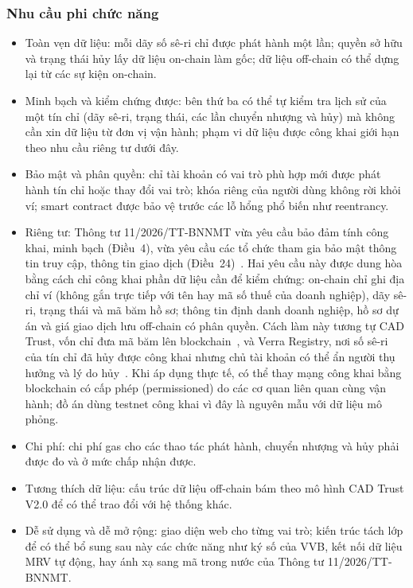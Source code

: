 \subsubsection*{Nhu cầu phi chức năng}

\begin{itemize}
    \item Toàn vẹn dữ liệu: mỗi dãy số sê-ri chỉ được phát hành một lần; quyền sở hữu và trạng thái hủy lấy dữ liệu on-chain làm gốc; dữ liệu off-chain có thể dựng lại từ các sự kiện on-chain.
    \item Minh bạch và kiểm chứng được: bên thứ ba có thể tự kiểm tra lịch sử của một tín chỉ (dãy sê-ri, trạng thái, các lần chuyển nhượng và hủy) mà không cần xin dữ liệu từ đơn vị vận hành; phạm vi dữ liệu được công khai giới hạn theo nhu cầu riêng tư dưới đây.
    \item Bảo mật và phân quyền: chỉ tài khoản có vai trò phù hợp mới được phát hành tín chỉ hoặc thay đổi vai trò; khóa riêng của người dùng không rời khỏi ví; smart contract được bảo vệ trước các lỗ hổng phổ biến như reentrancy.
    \item Riêng tư: Thông tư 11/2026/TT-BNNMT vừa yêu cầu bảo đảm tính công khai, minh bạch (Điều~4), vừa yêu cầu các tổ chức tham gia bảo mật thông tin truy cập, thông tin giao dịch (Điều~24)~\cite{vietnam2026thongtu11}. Hai yêu cầu này được dung hòa bằng cách chỉ công khai phần dữ liệu cần để kiểm chứng: on-chain chỉ ghi địa chỉ ví (không gắn trực tiếp với tên hay mã số thuế của doanh nghiệp), dãy sê-ri, trạng thái và mã băm hồ sơ; thông tin định danh doanh nghiệp, hồ sơ dự án và giá giao dịch lưu off-chain có phân quyền. Cách làm này tương tự CAD Trust, vốn chỉ đưa mã băm lên blockchain~\cite{cadtrust2025datamodel}, và Verra Registry, nơi số sê-ri của tín chỉ đã hủy được công khai nhưng chủ tài khoản có thể ẩn người thụ hưởng và lý do hủy~\cite{verra2020registryv2}. Khi áp dụng thực tế, có thể thay mạng công khai bằng blockchain có cấp phép (permissioned) do các cơ quan liên quan cùng vận hành; đồ án dùng testnet công khai vì đây là nguyên mẫu với dữ liệu mô phỏng.
    \item Chi phí: chi phí gas cho các thao tác phát hành, chuyển nhượng và hủy phải được đo và ở mức chấp nhận được.
    \item Tương thích dữ liệu: cấu trúc dữ liệu off-chain bám theo mô hình CAD Trust V2.0 để có thể trao đổi với hệ thống khác.
    \item Dễ sử dụng và dễ mở rộng: giao diện web cho từng vai trò; kiến trúc tách lớp để có thể bổ sung sau này các chức năng như ký số của VVB, kết nối dữ liệu MRV tự động, hay ánh xạ sang mã trong nước của Thông tư 11/2026/TT-BNNMT.
\end{itemize}

